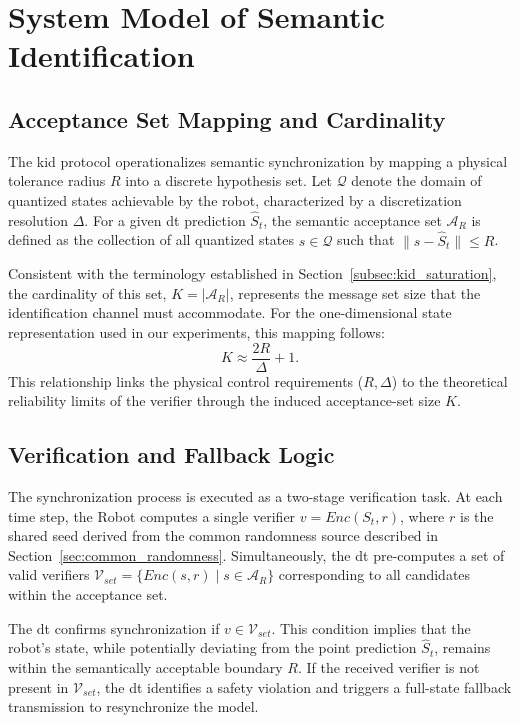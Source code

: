 \section{System Model of Semantic Identification}
\label{sec:semantic_system_model}

\subsection{Acceptance Set Mapping and Cardinality}
\label{subsec:acceptance_set}

The \gls{kid} protocol operationalizes semantic synchronization by mapping a physical tolerance radius $R$ into a discrete hypothesis set. Let $\mathcal{Q}$ denote the domain of quantized states achievable by the robot, characterized by a discretization resolution $\Delta$. For a given \gls{dt} prediction $\hat{S}_t$, the semantic acceptance set $\mathcal{A}_R$ is defined as the collection of all quantized states $s \in \mathcal{Q}$ such that $\lVert s - \hat{S}_t \rVert \le R$.

Consistent with the terminology established in Section~\ref{subsec:kid_saturation}, the cardinality of this set, $K = |\mathcal{A}_R|$, represents the message set size that the identification channel must accommodate. For the one-dimensional state representation used in our experiments, this mapping follows:
\begin{equation}
    K \approx \frac{2R}{\Delta} + 1.
\end{equation}
This relationship links the physical control requirements ($R, \Delta$) to the theoretical reliability limits of the verifier through the induced acceptance-set size $K$.



\subsection{Verification and Fallback Logic}

The synchronization process is executed as a two-stage verification task. At each time step, the Robot computes a single verifier $v = Enc(S_t, r)$, where $r$ is the shared seed derived from the common randomness source described in Section~\ref{sec:common_randomness}. Simultaneously, the \gls{dt} pre-computes a set of valid verifiers $\mathcal{V}_{set} = \{Enc(s, r) \mid s \in \mathcal{A}_R\}$ corresponding to all candidates within the acceptance set.

The \gls{dt} confirms synchronization if $v \in \mathcal{V}_{set}$. This condition implies that the robot's state, while potentially deviating from the point prediction $\hat{S}_t$, remains within the semantically acceptable boundary $R$. If the received verifier is not present in $\mathcal{V}_{set}$, the \gls{dt} identifies a safety violation and triggers a full-state fallback transmission to resynchronize the model.

